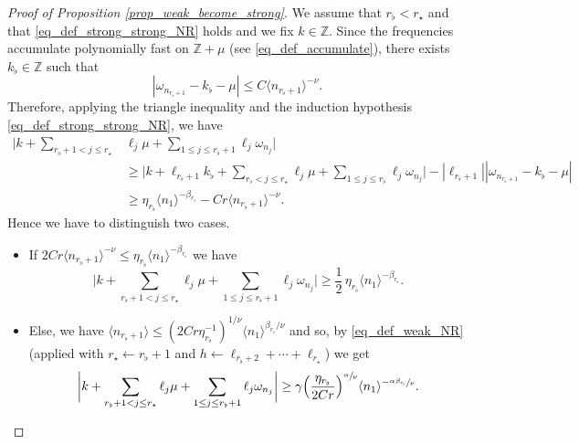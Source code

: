 \documentclass[11pt]{article}
\theoremstyle{definition}
\begin{document}
\begin{proof}[Proof of Proposition \ref{prop_weak_become_strong}]
We assume that $r_\flat < r_\star$ and that \eqref{eq_def_strong_strong_NR} holds and we fix $k\in \mathbb{Z}$.
Since the frequencies accumulate polynomially fast on $\mathbb{Z} + \mu$ (see \eqref{eq_def_accumulate}), there exists $k_\flat \in \mathbb{Z}$ such that
\[
|\omega_{n_{r_\flat +1} } - k_\flat-\mu|\leq C \langle n_{r_\flat +1} \rangle^{-\nu}.
\]
Therefore, applying the triangle inequality and the induction hypothesis \eqref{eq_def_strong_strong_NR}, we have
\begin{equation*}
\begin{split}
\biggl| k + \sum_{{r_{\flat}+1} <j \leq r_\star} &\ell_j \mu + \sum_{1\leq j \leq {r_{\flat}+1} }\ell_j \omega_{n_j} \biggr| \\
&\geq \biggl| k + \ell_{r_\flat+1} k_\flat + \sum_{r_{\flat} <j \leq r_\star} \ell_j \mu + \sum_{1\leq j \leq r_{\flat} }\ell_j \omega_{n_j} \biggr| - |\ell_{r_\flat+1}| |\omega_{n_{r_\flat +1} } - k_\flat -\mu| \\
&\geq \eta_{r_\flat} \langle n_{1} \rangle^{-\beta_{r_\flat}} -C r \langle n_{r_\flat +1} \rangle^{-\nu}.
\end{split}
\end{equation*}
Hence we have to distinguish two cases.
\begin{itemize}
\item
If $2 Cr \langle n_{r_\flat +1} \rangle^{-\nu} \leq \eta_{r_\flat} \langle n_{1} \rangle^{-\beta_{r_\flat}}$ we have
\[
\biggl| k + \sum_{{r_{\flat}+1} <j \leq r_\star} \ell_j \mu + \sum_{1\leq j \leq {r_{\flat}+1} }\ell_j \omega_{n_j} \biggr|\geq \frac12\, \eta_{r_\flat} \langle n_{1} \rangle^{-\beta_{r_\flat}}.
\]
\item
Else, we have $\langle n_{r_\flat +1} \rangle \leq (2Cr\eta_{r_\flat}^{-1})^{1/\nu} \langle n_{1} \rangle^{\beta_{r_\flat}/\nu}$ and so, by \eqref{eq_def_weak_NR} (applied with $r_\star \leftarrow r_\flat+1$ and $h\leftarrow \ell_{r_{\flat}+2} + \cdots + \ell_{r_\star}$) we get
\[
\biggl| k + \sum_{{r_{\flat}+1} <j \leq r_\star} \ell_j \mu + \sum_{1\leq j \leq {r_{\flat}+1} }\ell_j \omega_{n_j} \biggr| \geq \gamma \Big(\frac{\eta_{r_\flat}}{2Cr}\Big)^{\sfrac{\alpha}{\nu}} \langle n_{1} \rangle^{-\sfrac{\alpha\beta_{r_\flat}}{\nu}}.\qedhere
\]
\end{itemize}
\end{proof}
\end{document}
